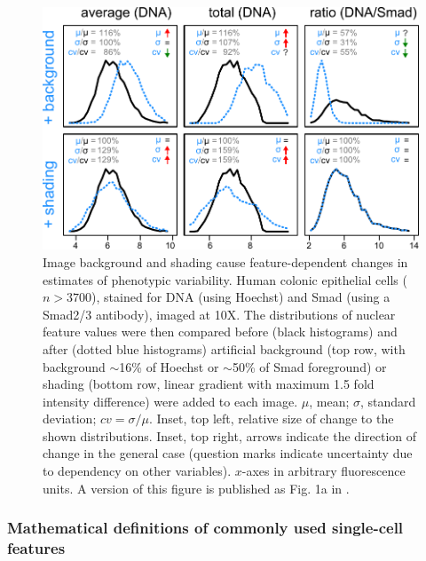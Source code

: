   \begin{figure}[!bt]
  \centering
  \includegraphics[width=4.5in]{FIGS/imaging/SBeffects.pdf}
  {\singlespacing 
  \caption[ Case study of the effects of $S$ and $B$ on single-cell features.]
            { Image background and shading cause feature-dependent changes
            in estimates of phenotypic variability.
            Human colonic epithelial cells ($n>3700$), stained for DNA
            (using Hoechst) and Smad (using a Smad2/3 antibody), imaged
            at 10X.
            The distributions of
            nuclear feature values were then compared
            before (black histograms) and after (dotted blue histograms)
            artificial background (top row, with
            background $\sim$16\% of Hoechst or $\sim$50\% of Smad foreground)
            or shading (bottom row, linear
            gradient with maximum 1.5 fold intensity difference) were added
            to each image. $\mu$, mean; $\sigma$, standard deviation;
            $cv=\sigma/\mu$. Inset, top left,
            relative size of change to the shown distributions. Inset, top right,
            arrows indicate the direction of
            change in the general case (question marks indicate uncertainty due to
            dependency on other variables). $x$-axes in arbitrary fluorescence units.
            A version of this figure is published as Fig. 1a in \cite{Coster2014}.}
  \label{fig:imaging:SBeffects}}
  \end{figure}





\subsubsection{Mathematical definitions of commonly used single-cell features}


